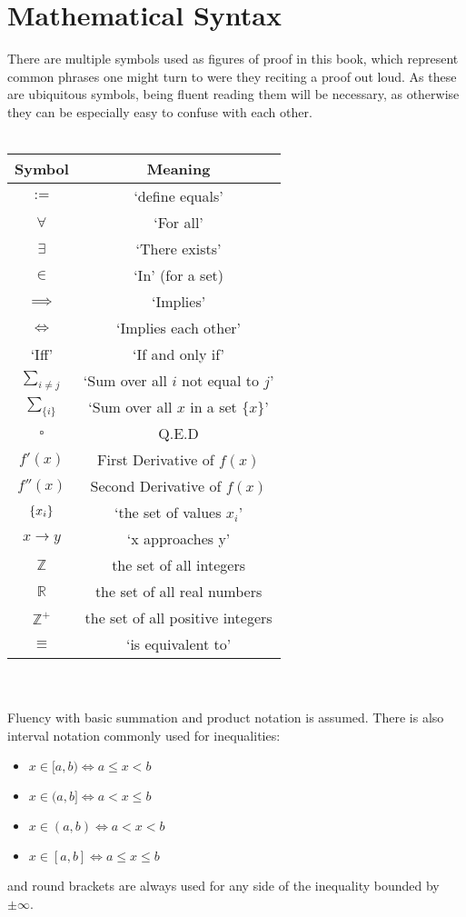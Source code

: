 \section{Mathematical Syntax}
There are multiple symbols used as figures of proof in this book, which represent common phrases one might turn to were they reciting a proof out loud. As these are ubiquitous symbols, being fluent reading them will be necessary, as otherwise they can be especially easy to confuse with each other.
\\\\
\begin{tabular}{| c | c |}
\hline
 \textbf{Symbol} & \textbf{Meaning} \\ 
 \hline
 $:=$ & `define equals'\\
 \hline
 $\forall$ & `For all' \\
 \hline
 $\exists$ & `There exists'\\
 \hline
 $\in$ & `In' (for a set)\\
 \hline
 $\implies$ & `Implies' \\
 \hline
 $\iff$ & `Implies each other' \\
 \hline
`Iff' & `If and only if' \\
\hline
 $\sum_{i\neq j}$ & `Sum over all $i$ not equal to $j$' \\
 \hline
 $\sum_{\{i\}}$ & `Sum over all $x$ in a set $\{x\}$'\\
 \hline
 $\square$ & Q.E.D \\
 \hline
 $f'(x)$ & First Derivative of $f(x)$ \\
 \hline
 $f''(x)$ & Second Derivative of $f(x)$\\
 \hline
 $\{x_{i}\}$ & `the set of values $x_{i}$'\\
 \hline
 $x\to y$ & `x approaches y'\\
 \hline
 $\mathbb{Z}$ & the set of all integers \\ 
 \hline
 $\mathbb{R}$ & the set of all real numbers \\
 \hline
 $\mathbb{Z}^{+}$ & the set of all positive integers \\
 \hline
 $\equiv$ & `is equivalent to'\\
 \hline
\end{tabular}
\\\\
Fluency with basic summation and product notation is assumed. There is also interval notation commonly used for inequalities:
\begin{itemize}
    \item $x\in[a,b)\iff a\leq x < b$
    \item $x\in(a,b]\iff a< x \leq b$
    \item $x\in(a,b) \iff a< x< b$
    \item $x\in [a,b] \iff a \leq x \leq b$
\end{itemize}
and round brackets are always used for any side of the inequality bounded by $\pm \infty$.
